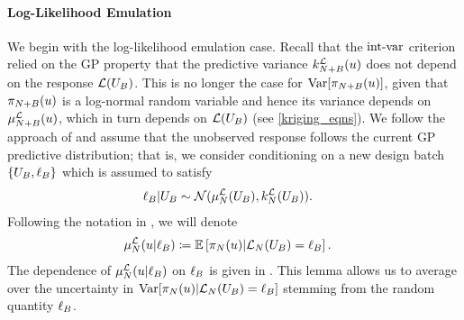\documentclass[12pt]{article}
\begin{document}
\paragraph{Log-Likelihood Emulation}
We begin with the log-likelihood emulation case. Recall that the 
$\intvarLabel$ criterion relied on the GP property that the predictive variance $\emKer[\Naugment]{\llik}(\Par)$
does not depend on the response $\llik(\designBatchIn)$. This is no longer the case for 
$\Var[\llikEmRdmDens[\Naugment](\Par)]$, given that $\llikEmRdmDens[\Naugment](\Par)$ is a log-normal 
random variable and hence its variance depends on $\emMean[\Naugment]{\llik}(\Par)$,  
which in turn depends on $\llik(\designBatchIn)$ (see \ref{kriging_eqns}). 
We follow the approach of \cite{VehtariParallelGP} and assume that the unobserved response follows the 
current GP predictive distribution; that is, we consider conditioning on a new design batch 
$\{\designBatchIn, \designBatchLlik\}$ which is assumed 
to satisfy 
\begin{align}
\designBatchLlik | \designBatchIn &\sim \Gaussian(\emMean[\Ndesign]{\llik}(\designBatchIn), \emKer[\Ndesign]{\llik}(\designBatchIn)).
\end{align}
Following the notation in , we will denote 
\begin{align}
\emMean[\Ndesign]{\llik}(\Par | \designBatchLlik)
&\Def \E\left[\llikEmRdmDens[\Ndesign](\Par) | \llikEm[\Ndesign](\designBatchIn) = \designBatchLlik \right]. 
\end{align}
The dependence of $\emMean[\Ndesign]{\llik}(\Par | \designBatchLlik)$ on $\designBatchLlik$ is given in 
. This lemma allows us to average over the uncertainty in  
$\Var[\llikEmRdmDens[\Ndesign](\Par) | \llikEm[\Ndesign](\designBatchIn) = \designBatchLlik]$ stemming from the
 random quantity $\designBatchLlik$. 
 
\end{document}
